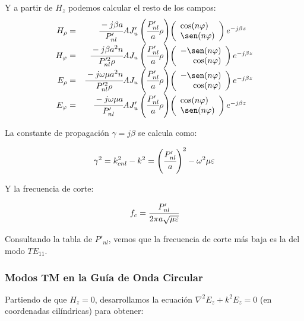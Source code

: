 \documentclass[12pt]{article}
\begin{document}
Y a partir de $H_z$ podemos calcular el resto de los campos:
$$\begin{array}{rr@{}l}
        H_\rho = & \cfrac{-j\beta a}{P'_{nl}} A J'_u\left(\cfrac{P'_{nl}}{a}\rho\right) & \left( \begin{array}{l}
        	\cos(n\varphi) \\
        	\sen(n\varphi)
        \end{array} \right) e^{-j\beta z}\\
        H_\varphi=  &  \cfrac{-j\beta a^2n}{P'^2_{nl}\rho} A J_u\left(\cfrac{P'_{nl}}{a}\rho\right) & \left( \begin{array}{r}
        	-\sen(n\varphi) \\
        	\cos(n\varphi)
        \end{array} \right) e^{-j\beta z}\\
        E_\rho =&  \cfrac{-j\omega\mu a^2n}{P'^2_{nl}\rho} A J_u\left(\cfrac{P'_{nl}}{a}\rho\right) & \left( \begin{array}{r}
        	-\sen(n\varphi) \\
        	\cos(n\varphi)
        \end{array} \right) e^{-j\beta z}\\
        E_\varphi = & \cfrac{-j\omega\mu a}{P'_{nl}} AJ'_u\left(\cfrac{P'_{nl}}{a}\rho\right) & \left( \begin{array}{l}
        	\cos(n\varphi) \\
        	\sen(n\varphi)
        \end{array} \right) e^{-j\beta z} \end{array}$$
        
La constante de propagaci\'on $\gamma = j\beta$ se calcula como:

$$\gamma^2 = k^2_{cnl} -k^2 = \left(\cfrac{P'_{nl}}{a}\right)^2 - \omega^2\mu\varepsilon$$

Y la frecuencia de corte:

$$f_c = \cfrac{P'_{nl}}{2\pi a\sqrt{\mu\varepsilon}}$$

Consultando la tabla de $P'_{nl}$, vemos que la frecuencia de corte m\'as baja es la del modo $TE_{11}$.

\subsubsection{Modos TM en la Gu\'ia de Onda Circular}

Partiendo de que $H_z = 0$, desarrollamos  la ecuaci\'on $\nabla^2 E_z + k^2 E_z =0$ (en coordenadas cil\'indricas) para obtener:
\end{document}
